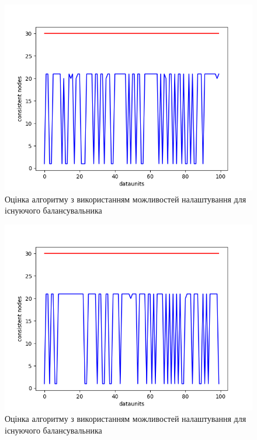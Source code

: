 \documentclass[14pt]{vakthesis}
\begin{document}
\begin{figure}
\centering

\includegraphics[width=\linewidth]{images/lb_haproxy_configuration/w_3000_r_500.png}

     \caption{Оцінка алгоритму з використанням можливостей налаштування для існуючого балансувальника}
     \label{fig:lb_haproxy_config_3000}
\end{figure}

\begin{figure}
\centering

\includegraphics[width=\linewidth]{images/lb_haproxy_configuration/w_5000_r_500.png}

     \caption{Оцінка алгоритму з використанням можливостей налаштування для існуючого балансувальника}
     \label{fig:lb_haproxy_config_5000}
\end{figure}
\end{document}

